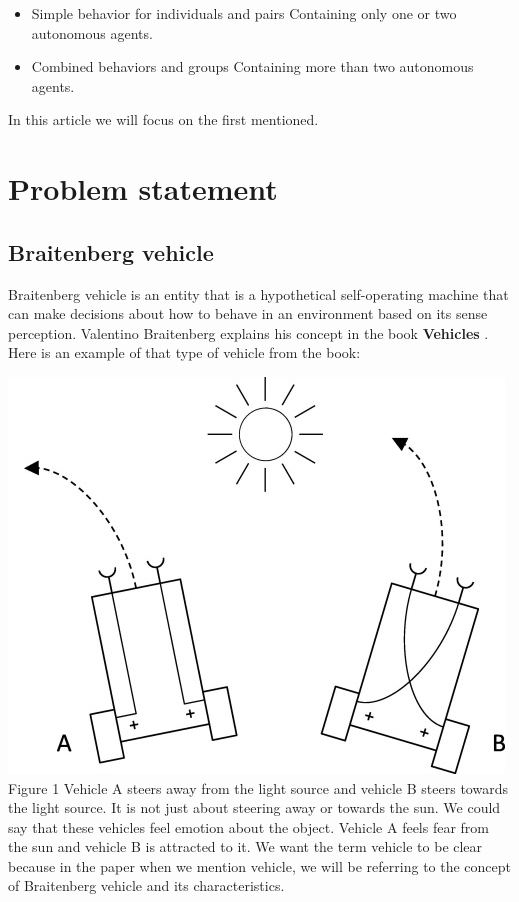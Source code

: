\documentclass[10pt,twoside,english,a4paper]{article}
\begin{document}
\begin{itemize}
\item Simple behavior for individuals and pairs\newline
Containing only one or two autonomous agents.

\item Combined behaviors and groups\newline
Containing more than two autonomous agents.

\end{itemize}

In this article we will focus on the first mentioned. 


\section{Problem statement} \label{problem}

\subsection{Braitenberg vehicle} \label{braitenberg}

Braitenberg vehicle is an entity that is a hypothetical self-operating machine that can make decisions about how to behave in an environment based on its sense perception. Valentino Braitenberg explains his concept in the book \textbf{Vehicles} \cite{Braitenberg}. Here is an example of that type of vehicle from the book:

\bigbreak

\includegraphics[scale=0.45]{braitenberg.jpg}
\quad Figure 1
\bigbreak
Vehicle A steers away from the light source and vehicle B steers towards the light source. It is not just about steering away or towards the sun. We could say that these vehicles feel emotion about the object. Vehicle A feels fear from the sun and vehicle B is attracted to it. We want the term vehicle to be clear because in the paper when we mention vehicle, we will be referring to the concept of Braitenberg vehicle and its characteristics. 
\end{document}
